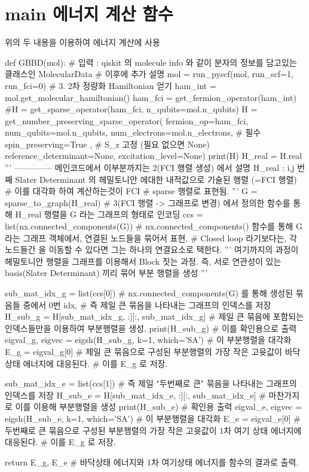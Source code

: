\documentclass[11pt]{article}
\begin{document}
\section{main 에너지 계산 함수}
위의 두 내용을 이용하여 에너지 계산에 사용
\begin{CodeBox}[title={Example: Python snippet}]
def GBBD(mol):
  # 입력 : qiskit 의 molecule info 와 같이 분자의 정보를 담고있는 클래스인 MolecularData
  # 이후에 추가 설명
  mol = run_pyscf(mol, run_scf=1, run_fci=0)
  # 3. 2차 정량화 Hamiltonian 얻기
  ham_int = mol.get_molecular_hamiltonian()
  ham_fci = get_fermion_operator(ham_int)     
  #H = get_sparse_operator(ham_fci, n_qubits=mol.n_qubits)
  H = get_number_preserving_sparse_operator(
  fermion_op=ham_fci,
  num_qubits=mol.n_qubits,
  num_electrons=mol.n_electrons,       # 필수
  spin_preserving=True ,        # S_z 고정 (필요 없으면 None)
  reference_determinant=None,
  excitation_level=None)
  print(H)
  H_real = H.real
  '''
  --------------
  메인코드에서 이부분까지는 2(FCI 행렬 생성) 에서 설명
  H_real : i,j 번째 Slater Determinant 의 헤밀토니안 에대한 내적값으로 기술된 행렬 (=FCI 행렬)
  # 이를 대각화 하여 계산하는것이 FCI
  # sparse 행렬로 표현됨. 
  '''
  G = sparse_to_graph(H_real)
  # 3(FCI 행렬 -> 그래프로 변경) 에서 정의한 함수를 통해 H_real 행렬을 G 라는 그래프의 형태로 인코딩
  ccs = list(nx.connected_components(G))
  # nx.connected_components() 함수를 통해 G 라는 그래프 객체에서, 연결된 노드들을 묶어서 표현.
  # Closed loop 라기보다는, 각 노드들간 을 이동할 수 있다면 그는 하나의 연결요소로 택한다. 
  '''
  여기까지의 과정이 헤밀토니안 행렬을 그래프를 이용해서 Block 짓는 과정. 
  즉, 서로 연관성이 있는 basis(Slater Determinant) 끼리 묶어 부분 행렬을 생성
  ''' 

  sub_mat_idx_g = list(ccs[0])
  # nx.connected_components(G) 를 통해 생성된 묶음들 중에서 0번 idx, 
  # 즉 제일 큰 묶음을 나타내는 그래프의 인덱스를 저장
  H_sub_g = H[sub_mat_idx_g, :][:, sub_mat_idx_g]
  # 제일 큰 묶음에 포함되는 인덱스들만을 이용하여 부분행렬을 생성.
  print(H_sub_g)
  # 이를 확인용으로 출력 
  eigval_g, eigvec = eigsh(H_sub_g, k=1, which='SA')
  # 이 부분행렬을 대각화 
  E_g = eigval_g[0]
  # 제일 큰 묶음으로 구성된 부분행렬의 가장 작은 고윳값이 바닥상태 에너지에 대응된다. 
  # 이를 E_g 로 저장. 

  sub_mat_idx_e = list(ccs[1])
  # 즉 제일 "두번째로 큰" 묶음을 나타내는 그래프의 인덱스를 저장
  H_sub_e = H[sub_mat_idx_e, :][:, sub_mat_idx_e]
  # 마찬가지로 이를 이용해 부분행렬을 생성
  print(H_sub_e)
  # 확인용 출력
  eigval_e, eigvec = eigsh(H_sub_e, k=1, which='SA')
  # 이 부분행렬을 대각화 
  E_e = eigval_e[0]
  # 두번째로 큰 묶음으로 구성된 부분행렬의 가장 작은 고윳값이 1차 여기 상태 에너지에 대응된다. 
  # 이를 E_g 로 저장. 

  return E_g, E_e # 바닥상태 에너지와 1차 여기상태 에너지를 함수의 결과로 출력.
\end{CodeBox}
\end{document}
